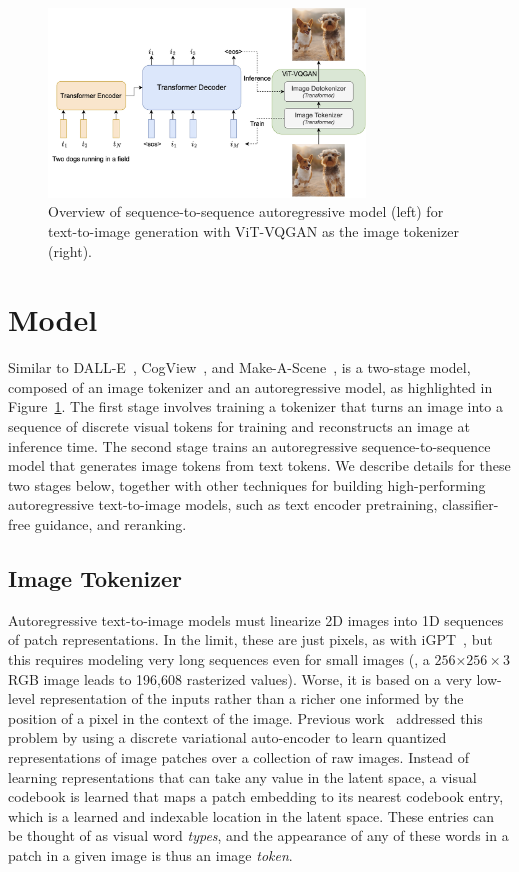\begin{figure}
    \centering
    \includegraphics[width=0.75\textwidth]{figures/parti.jpg}
    \caption{Overview of \bdraw sequence-to-sequence autoregressive model (left) for text-to-image generation with ViT-VQGAN as the image tokenizer~\cite{yu2021vector} (right).}
    \label{figs:overview}
\end{figure}


\section{\bdraw Model}  
Similar to DALL-E~\cite{ramesh2021zero}, CogView~\cite{ding2021cogview}, and Make-A-Scene~\cite{gafni2022make}, \bdraw is a two-stage model, composed of an image tokenizer and an autoregressive model, as highlighted in Figure~\ref{figs:overview}. The first stage involves training a tokenizer that turns an image into a sequence of discrete visual tokens for training and reconstructs an image at inference time. The second stage trains an autoregressive sequence-to-sequence model that generates image tokens from text tokens. We describe details for these two stages below, together with other techniques for building high-performing autoregressive text-to-image models, such as text encoder pretraining, classifier-free guidance, and reranking.


\subsection{Image Tokenizer} \label{secs:tokenizer}
Autoregressive text-to-image models must linearize 2D images into 1D sequences of patch representations. In the limit, these are just pixels, as with iGPT~\cite{chen2020generative}, but this requires modeling very long sequences even for small images (\eg, a \(256{\times256}\times3\) RGB image leads to 196,608 rasterized values). Worse, it is based on a very low-level representation of the inputs rather than a richer one informed by the position of a pixel in the context of the image. Previous work~\cite{van2017neural, ramesh2021zero, yu2021vector, gafni2022make} addressed this problem by using a discrete variational auto-encoder to learn quantized representations of image patches over a collection of raw images. Instead of learning representations that can take any value in the latent space, a visual codebook is learned that maps a patch embedding to its nearest codebook entry, which is a learned and indexable location in the latent space. These entries can be thought of as visual word \textit{types}, and the appearance of any of these words in a patch in a given image is thus an image \textit{token}.

